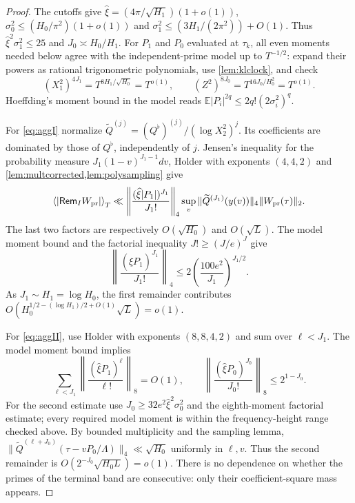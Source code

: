 \documentclass[11pt,reqno]{amsart}
\numberwithin{equation}{section}
\newcommand{\av}[1]{\left\langle #1\right\rangle_T}
\begin{document}
\begin{proof}
The cutoffs give
$\widehat\xi=(4\pi/\sqrt{H_1})(1+o(1))$,
$\sigma_0^2\le(H_0/\pi^2)(1+o(1))$ and
$\sigma_1^2\le(3H_1/(2\pi^2))+O(1)$.
Thus $\widehat\xi^2\sigma_1^2\le25$ and
$J_0\asymp H_0/H_1$.
For $P_1$ and $P_0$ evaluated at $\tau_k$, all even moments
needed below agree with the independent-prime model up to
$T^{-1/2}$: expand their powers as rational trigonometric
polynomials, use \cref{lem:klclock}, and check
\[
(X_1^2)^{4J_1}=T^{8H_1/\sqrt{H_0}}=T^{o(1)},
\qquad (Z^2)^{8J_0}=T^{16J_0/H_0^2}=T^{o(1)}.
\]
Hoeffding's moment bound in the model reads
$\mathbb E|P_i|^{2q}\le2q!(2\sigma_i^2)^q$.

For \eqref{eq:aggI} normalize
$\widetilde Q^{(j)}=(Q^\flat)^{(j)}/(\log X_2^2)^j$.
Its coefficients are dominated by those of $Q^\flat$,
independently of $j$.  Jensen's inequality for the probability
measure $J_1(1-v)^{J_1-1}dv$, Holder with exponents
$(4,4,2)$ and \cref{lem:multcorrected,lem:polysampling}
give
\[
\av{|\mathsf{Rem}_I W_{\rm pr}|}
\ll \left\|\frac{(\widehat\xi|P_1|)^{J_1}}{J_1!}\right\|_4
\sup_{v}\|\widetilde Q^{(J_1)}(y(v))\|_4
\|W_{\rm pr}(\tau)\|_2.
\]
The last two factors are respectively $O(\sqrt{H_0})$
and $O(\sqrt L)$.  The model moment bound and the factorial
inequality $J!\ge(J/e)^J$ give
\[
\left\|\frac{(\widehat\xi P_1)^{J_1}}{J_1!}\right\|_4
 \le2\left(\frac{100e^2}{J_1}\right)^{J_1/2}.
\]
As $J_1\sim H_1=\log H_0$, the first remainder contributes
$O(H_0^{1/2-(\log H_1)/2+O(1)}\sqrt L)=o(1)$.

For \eqref{eq:aggII}, use Holder with exponents
$(8,8,4,2)$ and sum over $\ell<J_1$.  The model moment bound
implies
\[
\sum_{\ell<J_1}\left\|\frac{(\widehat\xi P_1)^\ell}{\ell!}\right\|_8
 =O(1),
\qquad
\left\|\frac{(\widehat\xi P_0)^{J_0}}{J_0!}\right\|_8
 \le2^{1-J_0}.
\]
For the second estimate use $J_0\ge32e^2\widehat\xi^2\sigma_0^2$
and the eighth-moment factorial estimate; every required model
moment is within the frequency-height range checked above.
By bounded multiplicity and the sampling lemma,
$\|\widetilde Q^{(\ell+J_0)}(\tau-vP_0/\Lambda)\|_4
\ll\sqrt{H_0}$ uniformly in $\ell,v$.
Thus the second remainder is
$O(2^{-J_0}\sqrt{H_0L})=o(1)$.
There is no dependence on whether the primes of the terminal band
are consecutive: only their coefficient-square mass appears.
\end{proof}
\end{document}
